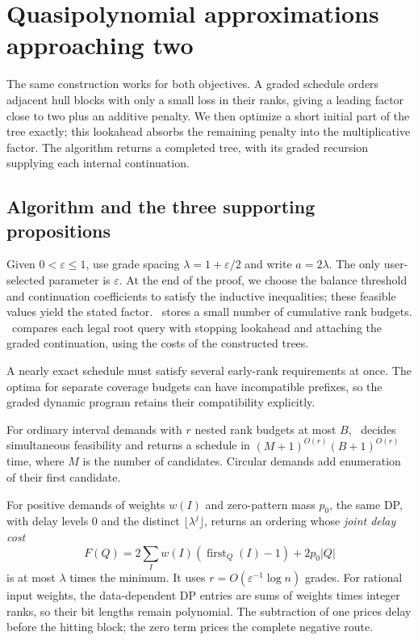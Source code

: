 \section{Quasipolynomial approximations approaching two}
\label{sec:quasipolynomial}

The same construction works for both objectives. A graded schedule
orders adjacent hull blocks with only a small loss in their ranks,
giving a leading factor close to two plus an additive penalty. We then
optimize a short initial part of the tree exactly; this lookahead
absorbs the remaining penalty into the multiplicative factor. The
algorithm returns a completed tree, with its graded recursion
supplying each internal continuation.

\subsection{Algorithm and the three supporting propositions}

Given $0<\varepsilon\le1$, use grade spacing
$\lambda=1+\varepsilon/2$ and write $a=2\lambda$.
The only user-selected parameter is $\varepsilon$. At the end of the
proof, we choose the balance threshold and continuation coefficients
to satisfy the inductive inequalities; these feasible values yield the
stated factor.
\GradeDP\ stores a small number of cumulative rank budgets.
\Rollout\ compares each legal root query with stopping lookahead and
attaching the graded continuation, using the costs of the constructed
trees.

A nearly exact schedule must satisfy several early-rank requirements
at once. The optima for separate coverage budgets can have incompatible
prefixes, so the graded dynamic program retains their compatibility
explicitly.

\begin{proposition}
\label{prop:qp-grade-schedule}
For ordinary interval demands with $r$ nested rank budgets at most $B$,
\GradeDP\ decides simultaneous feasibility and returns a schedule in
$(M+1)^{O(r)}(B+1)^{O(r)}$ time, where $M$ is the number of candidates.
Circular demands add enumeration of their first candidate.

For positive demands of weights $w(I)$ and zero-pattern mass $p_0$,
the same DP, with delay levels $0$ and the distinct
$\lfloor\lambda^j\rfloor$, returns an ordering whose
\emph{joint delay cost}
\[
 F(Q)=2\sum_Iw(I)(\operatorname{first}_Q(I)-1)+2p_0|Q|
\]
is at most $\lambda$ times the minimum. It uses
$r=O(\varepsilon^{-1}\log n)$ grades. For rational input weights,
the data-dependent DP entries are sums of weights times integer ranks,
so their bit lengths remain polynomial. The subtraction of one prices
delay before the hitting block; the zero term prices the complete
negative route.
\end{proposition}

